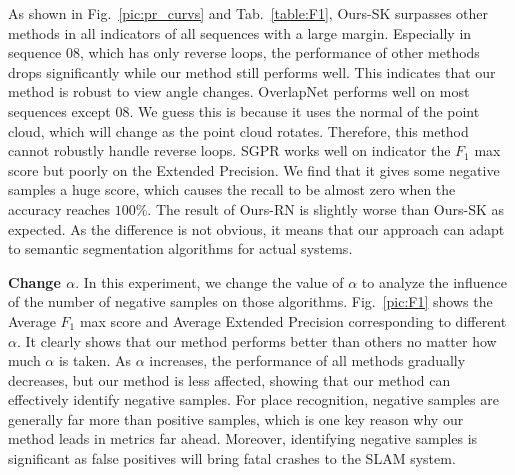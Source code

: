 \documentclass[letterpaper, 10 pt, conference]{ieeeconf}
\begin{document}
As shown in Fig.~\ref{pic:pr_curvs} and Tab.~\ref{table:F1}, Ours-SK surpasses other methods in all indicators of all sequences with a large margin. Especially in sequence 08, which has only reverse loops, the performance of other methods drops significantly while our method still performs well. This indicates that our method is robust to view angle changes. OverlapNet performs well on most sequences except 08. We guess this is because it uses the normal of the point cloud, which will change as the point cloud rotates. Therefore, this method cannot robustly handle reverse loops. SGPR works well on indicator the \(F_1\) max score but poorly on the Extended Precision. We find that it gives some negative samples a huge score, which causes the recall to be almost zero when the accuracy reaches \(100\%\). The result of Ours-RN is slightly worse than Ours-SK as expected. As the difference is not obvious, it means that our approach can adapt to semantic segmentation algorithms for actual systems.

\textbf{Change \(\alpha\)}. In this experiment, we change the value of \(\alpha\) to analyze the influence of the number of negative samples on those algorithms. Fig.~\ref{pic:F1} shows the Average \(F_1\) max score and Average Extended Precision corresponding to different \(\alpha\). It clearly shows that our method performs better than others no matter how much \(\alpha\) is taken. As \(\alpha\) increases, the performance of all methods gradually decreases, but our method is less affected, showing that our method can effectively identify negative samples. For place recognition, negative samples are generally far more than positive samples, which is one key reason why our method leads in metrics far ahead. Moreover, identifying negative samples is significant as false positives will bring fatal crashes to the SLAM system.
\end{document}
